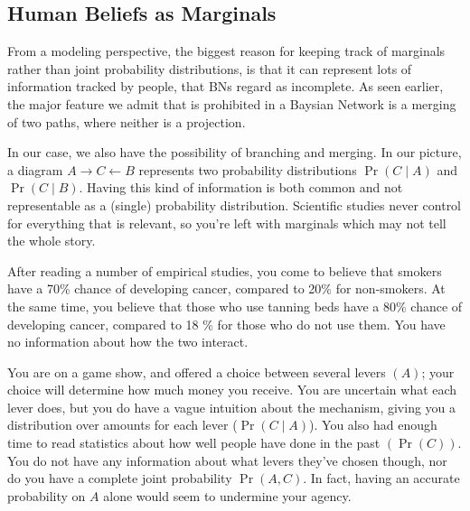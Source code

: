 \documentclass{article}
\begin{document}
	
	
	\subsection{Human Beliefs as Marginals}
	From a modeling perspective, the biggest reason for keeping track of marginals rather than joint probability distributions, is that it can represent lots of information tracked by people, that BNs regard as incomplete. As seen earlier, the major feature we admit that is prohibited in a Baysian Network is a merging of two paths, where neither is a projection.
	
	In our case, we also have the possibility of branching and merging. In our picture, a diagram $A \rightarrow C \leftarrow B$ represents two probability distributions $\Pr(C\mid A)$ and $\Pr(C \mid B)$.
	Having this kind of information is both common and not representable as a (single) probability distribution. Scientific studies never control for everything that is relevant, so you're left with marginals which may not tell the whole story.
	
	\begin{example}
		After reading a number of empirical studies, you come to believe that smokers have a 70\% chance of developing cancer, compared to 20\% for non-smokers. At the same time, you believe that those who use tanning beds have a 80\% chance of developing cancer, compared to 18 \% for those who do not use them. You have no information about how the two interact.
	\end{example}
	
	\begin{example}
		You are on a game show, and offered a choice between several levers $(A)$; your choice will determine how much money you receive. You are uncertain what each lever does, but you do have a vague intuition about the mechanism, giving you a distribution over amounts for each lever ($\Pr(C \mid A)$). You also had enough time to read statistics about how well people have done in the past $(\Pr(C))$. You do not have any information about what levers they've chosen though, nor do you have a complete joint probability $\Pr(A, C)$. In fact, having an accurate probability on $A$ alone would seem to undermine your agency.
	\end{example}
\end{document}
